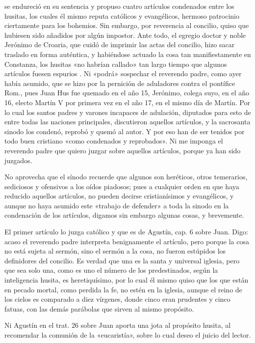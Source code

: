 se endureció en su sentencia y propuso cuatro artículos condenados entre los husitas, los cuales él mismo reputa católicos y evangélicos, hermoso patrocinio ciertamente para los bohemios. Sin embargo, por reverencia al concilio, quiso que hubiesen sido añadidos por algún impostor. Ante todo, el egregio doctor y noble Jerónimo de Croaria, que cuidó de imprimir las actas del concilio, hizo sacar traslado en forma auténtica, y habiéndose actuado la cosa tan manifiestamente en Constanza, los husitas «no habrían callado» tan largo tiempo que algunos artículos fuesen espurios \marginpar{\small[295]}. Ni «podrá» sospechar el reverendo padre, como ayer había asumido, que se hizo por la pernición de aduladores contra el pontífice Rom., pues Juan Hus fue quemado en el año 15, Jerónimo, colega suyo, en el año 16, electo Martín V por primera vez en el año 17, en el mismo día de Martín. Por lo cual los santos padres y varones incapaces de adulación, diputados para esto de entre todas las naciones principales, discutieron aquellos artículos, y la sacrosanta sinodo los condenó, reprobó y quemó al autor. Y por eso han de ser tenidos por todo buen cristiano «como condenados y reprobados». Ni me imponga el reverendo padre que quiero juzgar sobre aquellos artículos, porque ya han sido juzgados.

No aprovecha que el sínodo recuerde que algunos son heréticos, otros temerarios, sediciosos y ofensivos a los oídos piadosos; pues a cualquier orden en que haya reducido aquellos artículos, no pueden decirse cristianísimos y evangélicos, y aunque no haya asumido este «trabajo de defender» a toda la sinodo en la condenación de los artículos, digamos sin embargo algunas cosas, y brevemente.

El primer artículo lo juzga católico y que es de Agustín, cap. 6 sobre Juan. Digo: acaso el reverendo padre interpreta benignamente el artículo, pero porque la cosa no está sujeta al sermón, sino el sermón a la cosa, no fueron estúpidos los definidores del concilio. Es verdad que una es la santa y universal iglesia, pero que sea solo una, como es uno el número de los predestinados, según la inteligencia husita, es heretiquísimo, por lo cual él mismo quiso que los que están en pecado mortal, como perdida la fe, no estén en la iglesia, aunque el reino de los cielos es comparado a diez vírgenes, donde cinco eran prudentes y cinco fatuas, con las demás parábolas que sirven al mismo propósito.

Ni Agustín en el trat. 26 sobre Juan aporta una jota al propósito husita, al recomendar la comunión de la «eucaristía», sobre lo cual deseo el juicio del lector.

